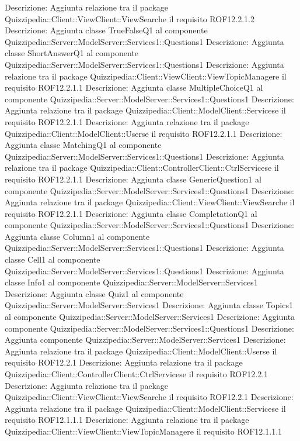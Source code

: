 Descrizione: Aggiunta relazione tra il package Quizzipedia::Client::ViewClient::ViewSearche il requisito ROF12.2.1.2 
Descrizione: Aggiunta classe TrueFalseQ1 al componente Quizzipedia::Server::ModelServer::Services1::Questions1 
Descrizione: Aggiunta classe ShortAnswerQ1 al componente Quizzipedia::Server::ModelServer::Services1::Questions1 
Descrizione: Aggiunta relazione tra il package Quizzipedia::Client::ViewClient::ViewTopicManagere il requisito ROF12.2.1.1 
Descrizione: Aggiunta classe MultipleChoiceQ1 al componente Quizzipedia::Server::ModelServer::Services1::Questions1 
Descrizione: Aggiunta relazione tra il package Quizzipedia::Client::ModelClient::Servicese il requisito ROF12.2.1.1 
Descrizione: Aggiunta relazione tra il package Quizzipedia::Client::ModelClient::Userse il requisito ROF12.2.1.1 
Descrizione: Aggiunta classe MatchingQ1 al componente Quizzipedia::Server::ModelServer::Services1::Questions1 
Descrizione: Aggiunta relazione tra il package Quizzipedia::Client::ControllerClient::CtrlServicese il requisito ROF12.2.1.1 
Descrizione: Aggiunta classe GenericQuestion1 al componente Quizzipedia::Server::ModelServer::Services1::Questions1 
Descrizione: Aggiunta relazione tra il package Quizzipedia::Client::ViewClient::ViewSearche il requisito ROF12.2.1.1 
Descrizione: Aggiunta classe CompletationQ1 al componente Quizzipedia::Server::ModelServer::Services1::Questions1 
Descrizione: Aggiunta classe Column1 al componente Quizzipedia::Server::ModelServer::Services1::Questions1 
Descrizione: Aggiunta classe Cell1 al componente Quizzipedia::Server::ModelServer::Services1::Questions1 
Descrizione: Aggiunta classe Info1 al componente Quizzipedia::Server::ModelServer::Services1 
Descrizione: Aggiunta classe Quiz1 al componente Quizzipedia::Server::ModelServer::Services1 
Descrizione: Aggiunta classe Topics1 al componente Quizzipedia::Server::ModelServer::Services1 
Descrizione: Aggiunta componente Quizzipedia::Server::ModelServer::Services1::Questions1 
Descrizione: Aggiunta componente Quizzipedia::Server::ModelServer::Services1 
Descrizione: Aggiunta relazione tra il package Quizzipedia::Client::ModelClient::Userse il requisito ROF12.2.1 
Descrizione: Aggiunta relazione tra il package Quizzipedia::Client::ControllerClient::CtrlServicese il requisito ROF12.2.1 
Descrizione: Aggiunta relazione tra il package Quizzipedia::Client::ViewClient::ViewSearche il requisito ROF12.2.1 
Descrizione: Aggiunta relazione tra il package Quizzipedia::Client::ModelClient::Servicese il requisito ROF12.1.1.1 
Descrizione: Aggiunta relazione tra il package Quizzipedia::Client::ViewClient::ViewTopicManagere il requisito ROF12.1.1.1 
